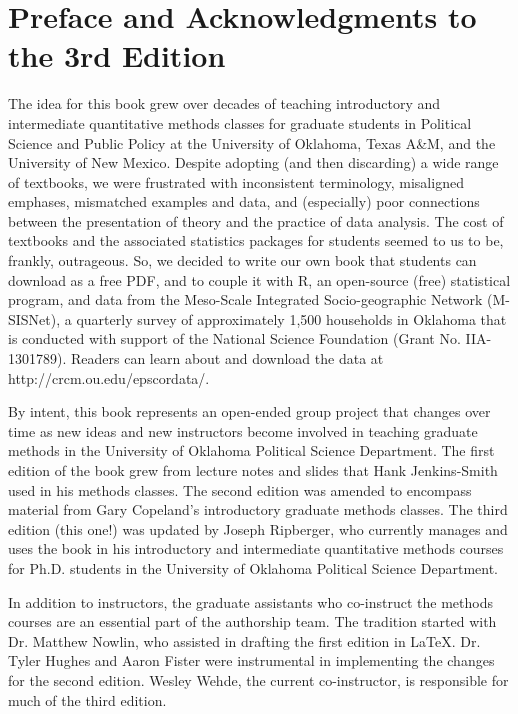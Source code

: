 \documentclass[11pt,openany]{book}\usepackage[]{graphicx}\usepackage[]{color}
\begin{document}
\chapter*{Preface and Acknowledgments to the 3rd Edition}
The idea for this book grew over decades of teaching introductory and intermediate quantitative methods classes for graduate students in Political Science and Public Policy at the University of Oklahoma, Texas A\&M, and the University of New Mexico. Despite adopting (and then discarding) a wide range of textbooks, we were frustrated with inconsistent terminology, misaligned emphases, mismatched examples and data, and (especially) poor connections between the presentation of theory and the practice of data analysis. The cost of textbooks and the associated statistics packages for students seemed to us to be, frankly, outrageous. So, we decided to write our own book that students can download as a free PDF, and to couple it with R, an open-source (free) statistical program, and data from the Meso-Scale Integrated Socio-geographic Network (M-SISNet), a quarterly survey of approximately 1,500 households in Oklahoma that is conducted with support of the National Science Foundation (Grant No. IIA-1301789). Readers can learn about and download the data at http://crcm.ou.edu/epscordata/.

By intent, this book represents an open-ended group project that changes over time as new ideas and new instructors become involved in teaching graduate methods in the University of Oklahoma Political Science Department. The first edition of the book grew from lecture notes and slides that Hank Jenkins-Smith used in his methods classes. The second edition was amended to encompass material from Gary Copeland’s introductory graduate methods classes. The third edition (this one!) was updated by Joseph Ripberger, who currently manages and uses the book in his introductory and intermediate quantitative methods courses for Ph.D. students in the University of Oklahoma Political Science Department.

In addition to instructors, the graduate assistants who co-instruct the methods courses are an essential part of the authorship team. The tradition started with Dr. Matthew Nowlin, who assisted in drafting the first edition in \LaTeX. Dr. Tyler Hughes and Aaron Fister were instrumental in implementing the changes for the second edition. Wesley Wehde, the current co-instructor, is responsible for much of the third edition. 
\end{document}
